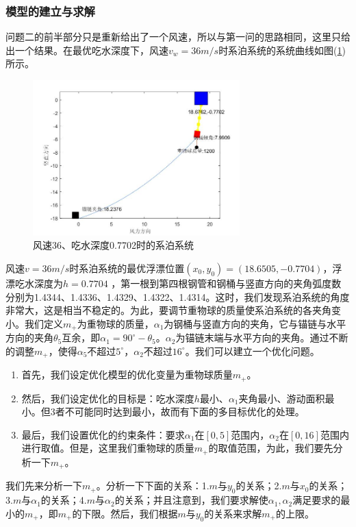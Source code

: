 \documentclass[UTF8]{ctexbook}
\theoremstyle{nonumberplain}
\begin{document}
        \subsubsection{模型的建立与求解}
            \par
            问题二的前半部分只是重新给出了一个风速，所以与第一问的思路相同，这里只给出一个结果。在最优吃水深度下，风速$v_w=36m/s$时系泊系统的系统曲线如图(\ref{风速36、吃水深度0.7702时的系泊系统})所示。
            \begin{figure}[H]
                \centering
                \includegraphics[width=8cm]{images/v_wind_36_h_xitong.jpg}
                \caption{风速36、吃水深度0.7702时的系泊系统}
                \label{风速36、吃水深度0.7702时的系泊系统}
            \end{figure}
            \par
            风速$v=36m/s$时系泊系统的最优浮漂位置$(x_0,y_0) = (18.6505,-0.7704)$，浮漂吃水深度为$h = 0.7704$ ，第一根到第四根钢管和钢桶与竖直方向的夹角弧度数分别为1.4344、1.4336、1.4329、1.4322、1.4314。这时，我们发现系泊系统的角度非常大，这是相当不稳定的。为此，要调节重物球的质量使系泊系统的各夹角变小。我们定义$m_+$为重物球的质量，$\alpha_1$为钢桶与竖直方向的夹角，它与锚链与水平方向的夹角$\theta_5$互余，即$\alpha_1 = 90^\circ - \theta_5$。$\alpha_2$为锚链末端与水平方向的夹角。通过不断的调整$m_+$，使得$\alpha_5$不超过$5^\circ$，$\alpha_2$不超过$16^\circ$。我们可以建立一个优化问题。
            \par
            \begin{enumerate}
            \item 首先，我们设定优化模型的优化变量为重物球质量$m_+$。
            \item 然后，我们设定优化的目标是：吃水深度$h$最小、$\alpha_1$夹角最小、游动面积最小。但3者不可能同时达到最小，故而有下面的多目标优化的处理。
            \item 最后，我们设置优化的约束条件：要求$\alpha_1$在$[0,5]$范围内，$\alpha_2$在$[0,16]$范围内进行取值。但是，这里我们重物球的质量$m_+$的取值范围，为此，我们要先分析一下$m_+$。
            \end{enumerate}
            \par
            我们先来分析一下$m_+$。分析一下下面的关系：1.$m$与$y_0$的关系；2.$m$与$x_0$的关系；3.$m$与$\alpha_1$的关系；4.$m$与$\alpha_2$的关系；并且注意到，我们要求解使$\alpha_1,\alpha_2$满足要求的最小的$m_+$，即$m_+$的下限。然后，我们根据$m$与$y_0$的关系来求解$m_+$的上限。
\end{document}
